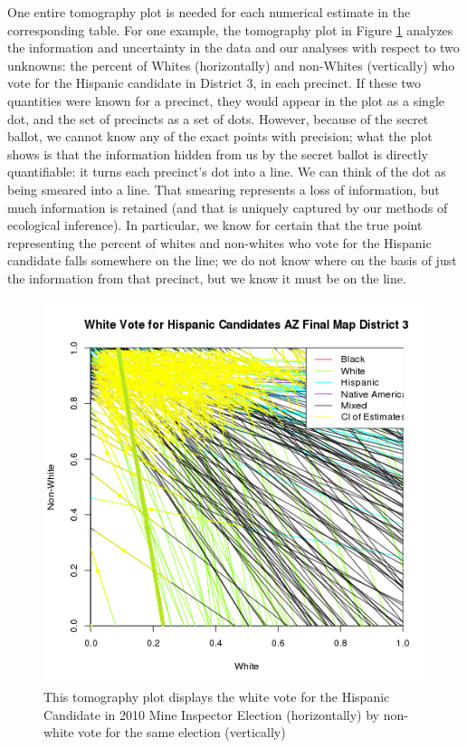 \documentclass[12pt]{article}
\begin{document}
One entire tomography plot is needed for each numerical estimate in
the corresponding table. For one example, the tomography plot in
Figure \ref{tomog} analyzes the information and uncertainty in the
data and our analyses with respect to two unknowns: the percent of
Whites (horizontally) and non-Whites (vertically) who vote for the
Hispanic candidate in District 3, in each precinct.  If these two
quantities were known for a precinct, they would appear in the plot as
a single dot, and the set of precincts as a set of dots.  However,
because of the secret ballot, we cannot know any of the exact points
with precision; what the plot shows is that the information hidden
from us by the secret ballot is directly quantifiable: it turns each
precinct's dot into a line.  We can think of the dot as being smeared
into a line. That smearing represents a loss of information, but much
information is retained (and that is uniquely captured by our methods
of ecological inference).  In particular, we know for certain that the
true point representing the percent of whites and non-whites who vote
for the Hispanic candidate falls somewhere on the line; we do not know
where on the basis of just the information from that precinct, but we
know it must be on the line.

\begin{figure}[htb]
\begin{centering}
\includegraphics[scale=1]{figs/pl_whitevote_h_3.png}
\caption{\label{tomog}This tomography plot displays the white vote
  for the Hispanic Candidate in 2010 Mine Inspector Election
  (horizontally) by non-white vote for the same election (vertically)}
\end{centering}
\end{figure}
\end{document}
